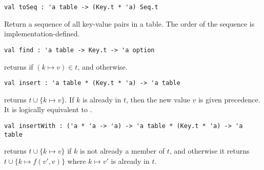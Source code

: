 \begin{cluster}
\label{grp:grm:table-interface::toseq}

\begin{gram}[toSeq]
\label{grm:table-interface::toseq}
\begin{verbatim}
val toSeq : 'a table -> (Key.t * 'a) Seq.t
\end{verbatim}
Return a sequence of all key-value pairs in a table. The order of the sequence
is implementation-defined.

\end{gram}
\end{cluster}

\begin{cluster}
\label{grp:grm:table-interface::find}

\begin{gram}[find]
\label{grm:table-interface::find}
\begin{verbatim}
val find : 'a table -> Key.t -> 'a option
\end{verbatim}
 returns  if $(k \mapsto v) \in t$, and 
otherwise.

\end{gram}
\end{cluster}

\begin{cluster}
\label{grp:grm:table-interface::insert}

\begin{gram}[insert]
\label{grm:table-interface::insert}
\begin{verbatim}
val insert : 'a table * (Key.t * 'a) -> 'a table
\end{verbatim}
 returns $t \cup \{k \mapsto v\}$. If $k$ is already
in $t$, then the new value $v$ is given precedence. It is logically equivalent
to .

\end{gram}
\end{cluster}

\begin{cluster}
\label{grp:grm:table-interface::insertwith}

\begin{gram}[insertWith]
\label{grm:table-interface::insertwith}
\begin{verbatim}
val insertWith : ('a * 'a -> 'a) -> 'a table * (Key.t * 'a) -> 'a table
\end{verbatim}
 returns $t \cup \{k \mapsto v\}$ if $k$ is not
already a member of $t$, and otherwise it returns $t \cup \{k \mapsto f(v',v)\}$
where $k \mapsto v'$ is already in $t$.

\end{gram}
\end{cluster}

